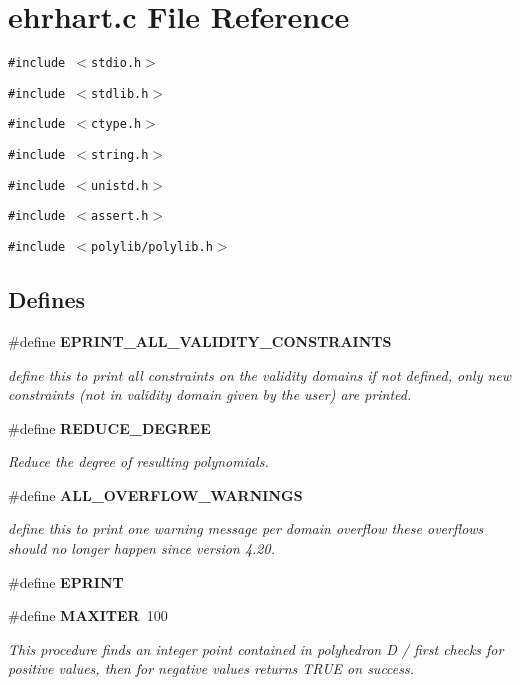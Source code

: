 \section{ehrhart.c File Reference}
\label{ehrhart_8c}
{\tt \#include $<$stdio.h$>$}\par
{\tt \#include $<$stdlib.h$>$}\par
{\tt \#include $<$ctype.h$>$}\par
{\tt \#include $<$string.h$>$}\par
{\tt \#include $<$unistd.h$>$}\par
{\tt \#include $<$assert.h$>$}\par
{\tt \#include $<$polylib/polylib.h$>$}\par
\subsection*{Defines}
\begin{CompactItemize}
\item 
\#define {\bf EPRINT\_\-ALL\_\-VALIDITY\_\-CONSTRAINTS}
\begin{CompactList}\small\item\em define this to print all constraints on the validity domains if not defined, only new constraints (not in validity domain given by the user) are printed.\item\end{CompactList}\item 
\#define {\bf REDUCE\_\-DEGREE}
\begin{CompactList}\small\item\em Reduce the degree of resulting polynomials.\item\end{CompactList}\item 
\#define {\bf ALL\_\-OVERFLOW\_\-WARNINGS}
\begin{CompactList}\small\item\em define this to print one warning message per domain overflow these overflows should no longer happen since version 4.20.\item\end{CompactList}\item 
\#define {\bf EPRINT}
\item 
\#define {\bf MAXITER}\ 100
\begin{CompactList}\small\item\em This procedure finds an integer point contained in polyhedron D / first checks for positive values, then for negative values returns TRUE on success.\item\end{CompactList}\end{CompactItemize}
